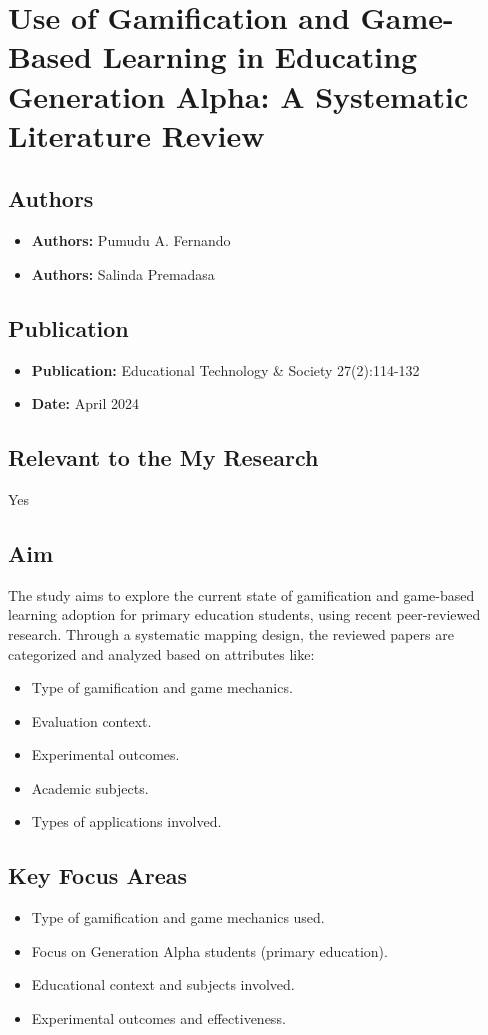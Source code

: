 \section{Use of Gamification and Game-Based Learning in Educating Generation Alpha: A Systematic Literature Review}

\subsection{Authors}
\begin{itemize}
    \item \textbf{Authors:} Pumudu A. Fernando
    \item  \textbf{Authors:} Salinda Premadasa
\end{itemize}

\subsection{Publication}
\begin{itemize}
    \item \textbf{Publication:} Educational Technology \& Society 27(2):114-132
    \item \textbf{Date:} April 2024 
\end{itemize}

\subsection{Relevant to the My Research}
Yes

\subsection{Aim}
The study aims to explore the current state of gamification and game-based learning adoption for primary education students, using recent peer-reviewed research. Through a systematic mapping design, the reviewed papers are categorized and analyzed based on attributes like:
\begin{itemize}
    \item Type of gamification and game mechanics.
    \item Evaluation context.
    \item Experimental outcomes.
    \item Academic subjects.
    \item Types of applications involved.
\end{itemize}

\subsection{Key Focus Areas}
\begin{itemize}
    \item Type of gamification and game mechanics used.
    \item Focus on Generation Alpha students (primary education).
    \item Educational context and subjects involved.
    \item Experimental outcomes and effectiveness.
\end{itemize}

